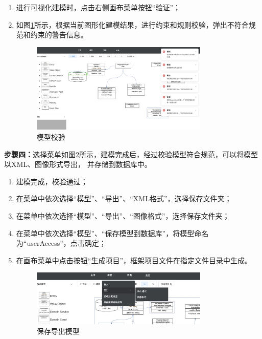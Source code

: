 \begin{enumerate}
    \item 进行可视化建模时，点击右侧画布菜单按钮“验证”；
    \item 如图\ref{validation}所示，根据当前图形化建模结果，进行约束和规则校验，弹出不符合规范和约束的警告信息。
    
    \begin{figure}[!htbp] %
        \centering %
        \includegraphics[width=0.8\textwidth]{FIGs/chapter5/validation.png} %
        \caption{模型校验} %
        \label{validation} %
    \end{figure}%
\end{enumerate}

\textbf{步骤四：}选择菜单如图\ref{exportModel}所示，建模完成后，经过校验模型符合规范，可以将模型以XML、图像形式导出，
并存储到数据库中。

\begin{enumerate}
    \item 建模完成，校验通过；
    \item 在菜单中依次选择“模型”、“导出”、“XML格式”，选择保存文件夹；
    \item 在菜单中依次选择“模型”、“导出”、“图像格式”，选择保存文件夹；
    \item 在菜单中依次选择“模型”、“保存模型到数据库”，将模型命名为“userAccess”，点击确定；
    \item 在画布菜单中点击按钮“生成项目”，框架项目文件在指定文件目录中生成。
    \begin{figure}[!htbp] %
        \centering %
        \includegraphics[width=0.8\textwidth]{FIGs/chapter5/exportModel.png} %
        \caption{保存导出模型} %
        \label{exportModel} %
    \end{figure}%
\end{enumerate}

